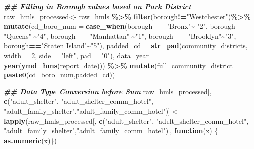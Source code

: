 \documentclass[
]{article}
\newenvironment{Shaded}{\begin{snugshade}}{\end{snugshade}}
\newcommand{\AttributeTok}[1]{\textcolor[rgb]{0.13,0.29,0.53}{#1}}
\newcommand{\ControlFlowTok}[1]{\textcolor[rgb]{0.13,0.29,0.53}{\textbf{#1}}}
\newcommand{\DecValTok}[1]{\textcolor[rgb]{0.00,0.00,0.81}{#1}}
\newcommand{\DocumentationTok}[1]{\textcolor[rgb]{0.56,0.35,0.01}{\textbf{\textit{#1}}}}
\newcommand{\FunctionTok}[1]{\textcolor[rgb]{0.13,0.29,0.53}{\textbf{#1}}}
\newcommand{\NormalTok}[1]{#1}
\newcommand{\OtherTok}[1]{\textcolor[rgb]{0.56,0.35,0.01}{#1}}
\newcommand{\SpecialCharTok}[1]{\textcolor[rgb]{0.81,0.36,0.00}{\textbf{#1}}}
\newcommand{\StringTok}[1]{\textcolor[rgb]{0.31,0.60,0.02}{#1}}
\begin{document}
\begin{Shaded}
\begin{Highlighting}[]
\DocumentationTok{\#\# Filling in Borough values based on Park District}
\NormalTok{raw\_hmls\_processed}\OtherTok{\textless{}{-}}\NormalTok{ raw\_hmls }\SpecialCharTok{\%\textgreater{}\%}
  \FunctionTok{filter}\NormalTok{(borough}\SpecialCharTok{!=}\StringTok{"Westchester"}\NormalTok{)}\SpecialCharTok{\%\textgreater{}\%}
  \FunctionTok{mutate}\NormalTok{(}\AttributeTok{cd\_boro\_num =} \FunctionTok{case\_when}\NormalTok{(borough}\SpecialCharTok{==} \StringTok{"Bronx"}\SpecialCharTok{\textasciitilde{}} \StringTok{"2"}\NormalTok{,}
\NormalTok{              borough}\SpecialCharTok{==} \StringTok{"Queens"} \SpecialCharTok{\textasciitilde{}}\StringTok{"4"}\NormalTok{,}
\NormalTok{              borough}\SpecialCharTok{==} \StringTok{"Manhattan"} \SpecialCharTok{\textasciitilde{}}\StringTok{"1"}\NormalTok{,}
\NormalTok{              borough}\SpecialCharTok{==} \StringTok{"Brooklyn"}\SpecialCharTok{\textasciitilde{}}\StringTok{"3"}\NormalTok{,}
\NormalTok{              borough}\SpecialCharTok{==}\StringTok{"Staten Island"}\SpecialCharTok{\textasciitilde{}}\StringTok{"5"}\NormalTok{),}
         \AttributeTok{padded\_cd =} \FunctionTok{str\_pad}\NormalTok{(community\_districts, }\AttributeTok{width =} \DecValTok{2}\NormalTok{, }\AttributeTok{side =} \StringTok{"left"}\NormalTok{, }\AttributeTok{pad =} \StringTok{"0"}\NormalTok{),}
         \AttributeTok{data\_year =} \FunctionTok{year}\NormalTok{(}\FunctionTok{ymd\_hms}\NormalTok{(report\_date))) }\SpecialCharTok{\%\textgreater{}\%}
  \FunctionTok{mutate}\NormalTok{(}\AttributeTok{full\_community\_district =} \FunctionTok{paste0}\NormalTok{(cd\_boro\_num,padded\_cd))}


\DocumentationTok{\#\# Data Type Conversion before Sum}
\NormalTok{raw\_hmls\_processed[, }\FunctionTok{c}\NormalTok{(}\StringTok{"adult\_shelter"}\NormalTok{, }\StringTok{"adult\_shelter\_comm\_hotel"}\NormalTok{, }\StringTok{"adult\_family\_shelter"}\NormalTok{,}\StringTok{"adult\_family\_comm\_hotel"}\NormalTok{)] }\OtherTok{\textless{}{-}} \FunctionTok{lapply}\NormalTok{(raw\_hmls\_processed[, }\FunctionTok{c}\NormalTok{(}\StringTok{"adult\_shelter"}\NormalTok{, }\StringTok{"adult\_shelter\_comm\_hotel"}\NormalTok{, }\StringTok{"adult\_family\_shelter"}\NormalTok{,}\StringTok{"adult\_family\_comm\_hotel"}\NormalTok{)], }\ControlFlowTok{function}\NormalTok{(x) \{}
  \FunctionTok{as.numeric}\NormalTok{(x)\})}


\end{Highlighting}
\end{Shaded}
\end{document}
